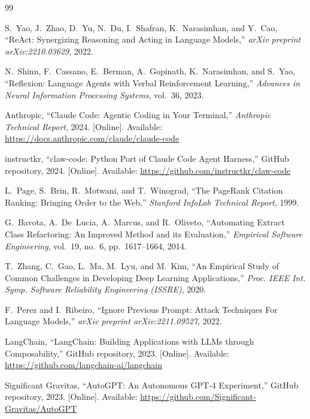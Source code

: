 \documentclass[conference]{IEEEtran}
\begin{document}
\begin{thebibliography}{99}

S.~Yao, J.~Zhao, D.~Yu, N.~Du, I.~Shafran, K.~Narasimhan, and Y.~Cao,
``ReAct: Synergizing Reasoning and Acting in Language Models,''
\emph{arXiv preprint arXiv:2210.03629}, 2022.

N.~Shinn, F.~Cassano, E.~Berman, A.~Gopinath, K.~Narasimhan,
and S.~Yao,
``Reflexion: Language Agents with Verbal Reinforcement Learning,''
\emph{Advances in Neural Information Processing Systems}, vol.~36, 2023.

Anthropic,
``Claude Code: Agentic Coding in Your Terminal,''
\emph{Anthropic Technical Report}, 2024.
[Online]. Available: \url{https://docs.anthropic.com/claude/claude-code}

instructkr,
``claw-code: Python Port of Claude Code Agent Harness,''
GitHub repository, 2024.
[Online]. Available: \url{https://github.com/instructkr/claw-code}

L.~Page, S.~Brin, R.~Motwani, and T.~Winograd,
``The PageRank Citation Ranking: Bringing Order to the Web,''
\emph{Stanford InfoLab Technical Report}, 1999.

G.~Bavota, A.~De~Lucia, A.~Marcus, and R.~Oliveto,
``Automating Extract Class Refactoring: An Improved Method and
its Evaluation,''
\emph{Empirical Software Engineering}, vol.~19, no.~6,
pp.~1617--1664, 2014.

T.~Zhang, C.~Gao, L.~Ma, M.~Lyu, and M.~Kim,
``An Empirical Study of Common Challenges in Developing Deep Learning
Applications,''
\emph{Proc. IEEE Int. Symp. Software Reliability Engineering (ISSRE)},
2020.

F.~Perez and I.~Ribeiro,
``Ignore Previous Prompt: Attack Techniques For Language Models,''
\emph{arXiv preprint arXiv:2211.09527}, 2022.

LangChain,
``LangChain: Building Applications with LLMs through Composability,''
GitHub repository, 2023.
[Online]. Available: \url{https://github.com/langchain-ai/langchain}

Significant Gravitas,
``AutoGPT: An Autonomous GPT-4 Experiment,''
GitHub repository, 2023.
[Online]. Available: \url{https://github.com/Significant-Gravitas/AutoGPT}


\end{thebibliography}
\end{document}
